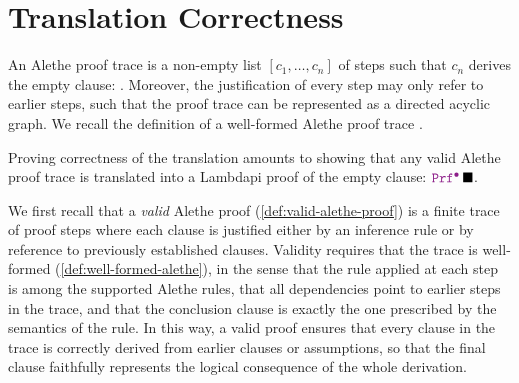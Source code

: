 \chapter{Translation Correctness}\label{ch:soundness}

An Alethe proof trace is a non-empty list $[c_1, \dots, c_n]$ of steps such that $c_n$ derives the empty clause: .
Moreover, the justification of every step may only refer to earlier steps, such that the proof trace can be represented as a directed acyclic graph.
We recall the definition of a well-formed Alethe proof trace \cite[Def.\ 7.2]{alethespec}.

\smallskip 

Proving correctness of the translation amounts to showing that any valid Alethe proof trace is translated into a Lambdapi proof of the empty clause: $\prfcl\, \nil$.

We first recall that a \emph{valid} Alethe proof (\cref{def:valid-alethe-proof}) is a finite trace of proof steps where each clause is justified either by an inference rule or by reference to previously established clauses.
Validity requires that the trace is well-formed (\cref{def:well-formed-alethe}), in the sense that the rule applied at each step is among the supported Alethe rules, that all dependencies point to earlier steps in the trace, and that the conclusion clause is exactly the one prescribed by the semantics of the rule.
In this way, a valid proof ensures that every clause in the trace is correctly derived from earlier clauses or assumptions, so that the final clause faithfully represents the logical consequence of the whole derivation.

